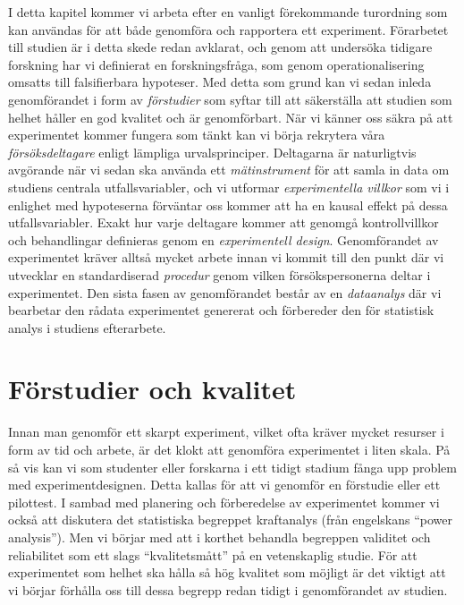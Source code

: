 \documentclass[
]{book}
\begin{document}
I detta kapitel kommer vi arbeta efter en vanligt förekommande turordning som kan användas för att både genomföra och rapportera ett experiment. Förarbetet till studien är i detta skede redan avklarat, och genom att undersöka tidigare forskning har vi definierat en forskningsfråga, som genom operationalisering omsatts till falsifierbara hypoteser. Med detta som grund kan vi sedan inleda genomförandet i form av \emph{förstudier} som syftar till att säkerställa att studien som helhet håller en god kvalitet och är genomförbart. När vi känner oss säkra på att experimentet kommer fungera som tänkt kan vi börja rekrytera våra \emph{försöksdeltagare} enligt lämpliga urvalsprinciper. Deltagarna är naturligtvis avgörande när vi sedan ska använda ett \emph{mätinstrument} för att samla in data om studiens centrala utfallsvariabler, och vi utformar \emph{experimentella villkor} som vi i enlighet med hypoteserna förväntar oss kommer att ha en kausal effekt på dessa utfallsvariabler. Exakt hur varje deltagare kommer att genomgå kontrollvillkor och behandlingar definieras genom en \emph{experimentell design}. Genomförandet av experimentet kräver alltså mycket arbete innan vi kommit till den punkt där vi utvecklar en standardiserad \emph{procedur} genom vilken försökspersonerna deltar i experimentet. Den sista fasen av genomförandet består av en \emph{dataanalys} där vi bearbetar den rådata experimentet genererat och förbereder den för statistisk analys i studiens efterarbete.

\hypertarget{sec07.1}{%
\section{Förstudier och kvalitet}\label{sec07.1}}

Innan man genomför ett skarpt experiment, vilket ofta kräver mycket resurser i form av tid och arbete, är det klokt att genomföra experimentet i liten skala. På så vis kan vi som studenter eller forskarna i ett tidigt stadium fånga upp problem med experimentdesignen. Detta kallas för att vi genomför en förstudie eller ett pilottest. I sambad med planering och förberedelse av experimentet kommer vi också att diskutera det statistiska begreppet kraftanalys (från engelskans ``power analysis''). Men vi börjar med att i korthet behandla begreppen validitet och reliabilitet som ett slags ``kvalitetsmått'' på en vetenskaplig studie. För att experimentet som helhet ska hålla så hög kvalitet som möjligt är det viktigt att vi börjar förhålla oss till dessa begrepp redan tidigt i genomförandet av studien.
\end{document}
